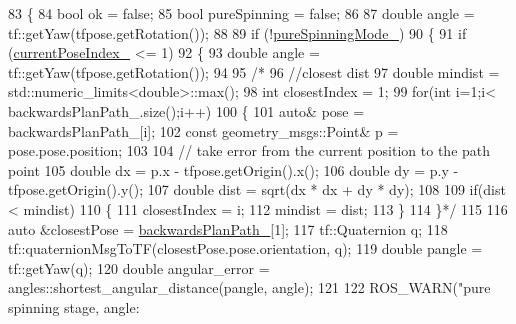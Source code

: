 \begin{DoxyCode}
83 \{
84     \textcolor{keywordtype}{bool} ok = \textcolor{keyword}{false};
85     \textcolor{keywordtype}{bool} pureSpinning = \textcolor{keyword}{false};
86 
87     \textcolor{keywordtype}{double} angle = tf::getYaw(tfpose.getRotation());
88 
89     \textcolor{keywordflow}{if} (!\hyperlink{classmove__base__z__client_1_1backward__local__planner_1_1BackwardLocalPlanner_abf2b84c0d7a841a7fcec1b93bf5fdd0e}{pureSpinningMode\_})
90     \{
91         \textcolor{keywordflow}{if} (\hyperlink{classmove__base__z__client_1_1backward__local__planner_1_1BackwardLocalPlanner_af304b2e7cde744ad905a1ae7889102b6}{currentPoseIndex\_} <= 1)
92         \{
93             \textcolor{keywordtype}{double} angle = tf::getYaw(tfpose.getRotation());
94 
95             \textcolor{comment}{/*}
96 \textcolor{comment}{            //closest dist}
97 \textcolor{comment}{            double mindist = std::numeric\_limits<double>::max();}
98 \textcolor{comment}{            int closestIndex = 1;}
99 \textcolor{comment}{            for(int i=1;i< backwardsPlanPath\_.size();i++)}
100 \textcolor{comment}{            \{}
101 \textcolor{comment}{                auto& pose = backwardsPlanPath\_[i];}
102 \textcolor{comment}{                const geometry\_msgs::Point& p = pose.pose.position;}
103 \textcolor{comment}{}
104 \textcolor{comment}{                // take error from the current position to the path point}
105 \textcolor{comment}{                double dx = p.x - tfpose.getOrigin().x();}
106 \textcolor{comment}{                double dy = p.y - tfpose.getOrigin().y();}
107 \textcolor{comment}{                double dist = sqrt(dx * dx + dy * dy);}
108 \textcolor{comment}{}
109 \textcolor{comment}{                if(dist < mindist)}
110 \textcolor{comment}{                \{}
111 \textcolor{comment}{                    closestIndex = i;}
112 \textcolor{comment}{                    mindist = dist;}
113 \textcolor{comment}{                \}}
114 \textcolor{comment}{            \}*/}
115 
116             \textcolor{keyword}{auto} &closestPose = \hyperlink{classmove__base__z__client_1_1backward__local__planner_1_1BackwardLocalPlanner_a451add2af7d6d83a7415277311b3ed04}{backwardsPlanPath\_}[1];
117             tf::Quaternion q;
118             tf::quaternionMsgToTF(closestPose.pose.orientation, q);
119             \textcolor{keywordtype}{double} pangle = tf::getYaw(q);
120             \textcolor{keywordtype}{double} angular\_error = angles::shortest\_angular\_distance(pangle, angle);
121 
122             ROS\_WARN(\textcolor{stringliteral}{"pure spinning stage, angle: %
}
\end{DoxyCode}
